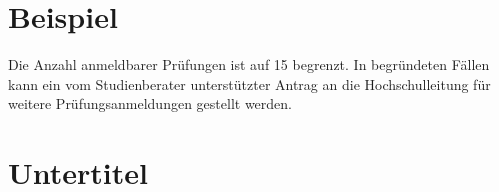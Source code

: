 \documentclass[]{subfiles}
\begin{document}
\section{Beispiel}
    Die Anzahl anmeldbarer Prüfungen ist auf 15 begrenzt. In begründeten Fällen kann ein vom Studienberater unterstützter Antrag an die Hochschulleitung für weitere Prüfungsanmeldungen gestellt werden.
\section*{Untertitel}
\end{document}
